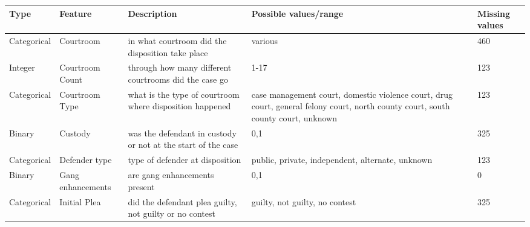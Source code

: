 
\begin{table*}
\centering
\tiny
\begin{tabular}{llp{8cm}p{5cm}l}
Type        & Feature              & Description                                                                                             & Possible values/range                                                                                                             & Missing values \\ \hline
Categorical & Courtroom            & in what courtroom did the disposition take place                                                        & various                                                                                                                           & 460            \\
Integer     & Courtroom Count      & through how many different courtrooms did the case go                                                   & 1-17                                                                                                                              & 123            \\
Categorical & Courtroom Type       & what is the type of courtroom where disposition happened                                                & case management court, domestic violence court, drug court, general felony court, north county court, south county court, unknown & 123            \\
Binary      & Custody              & was the defendant in custody or not at the start of the case                                            & 0,1                                                                                                                               & 325            \\
Categorical & Defender type        & type of defender at disposition                                                                         & public, private, independent, alternate, unknown                                                                                  & 123            \\
Binary      & Gang enhancements    & are gang enhancements present                                                                           & 0,1                                                                                                                               & 0              \\
Categorical & Initial Plea         & did the defendant plea guilty, not guilty or no contest                                                 & guilty, not guilty, no contest                                                                                                    & 325            \\

\end{tabular}
\end{table*}
